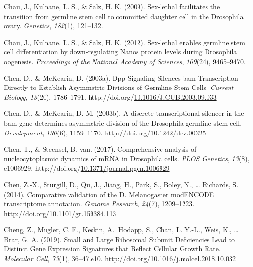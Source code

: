 \documentclass[12pt,oneside]{reedthesis}
\newlength{\cslhangindent}
\newenvironment{CSLReferences}[2] %
 {%
  \setlength{\parindent}{0pt}
  \ifodd #1 \everypar{\setlength{\hangindent}{\cslhangindent}}\ignorespaces\fi
  \ifnum #2 > 0
  \setlength{\parskip}{#2\baselineskip}
  \fi
 }%
 {}
\begin{document}
\begin{CSLReferences}{1}{0}
\leavevmode{}%
Chau, J., Kulnane, L. S., \& Salz, H. K. (2009). Sex-lethal facilitates the transition from germline stem cell to committed daughter cell in the {Drosophila} ovary. \emph{Genetics}, \emph{182}(1), 121--132.

\leavevmode{}%
Chau, J., Kulnane, L. S., \& Salz, H. K. (2012). Sex-lethal enables germline stem cell differentiation by down-regulating {Nanos} protein levels during {Drosophila} oogenesis. \emph{Proceedings of the National Academy of Sciences}, \emph{109}(24), 9465--9470.

\leavevmode{}%
Chen, D., \& McKearin, D. (2003a). Dpp {Signaling Silences} bam {Transcription Directly} to {Establish Asymmetric Divisions} of {Germline Stem Cells}. \emph{Current Biology}, \emph{13}(20), 1786--1791. http://doi.org/\href{https://doi.org/10.1016/J.CUB.2003.09.033}{10.1016/J.CUB.2003.09.033}

\leavevmode{}%
Chen, D., \& McKearin, D. M. (2003b). A discrete transcriptional silencer in the bam gene determines asymmetric division of the {Drosophila} germline stem cell. \emph{Development}, \emph{130}(6), 1159--1170. http://doi.org/\href{https://doi.org/10.1242/dev.00325}{10.1242/dev.00325}

\leavevmode{}%
Chen, T., \& Steensel, B. van. (2017). Comprehensive analysis of nucleocytoplasmic dynamics of {mRNA} in {Drosophila} cells. \emph{PLOS Genetics}, \emph{13}(8), e1006929. http://doi.org/\href{https://doi.org/10.1371/journal.pgen.1006929}{10.1371/journal.pgen.1006929}

\leavevmode{}%
Chen, Z.-X., Sturgill, D., Qu, J., Jiang, H., Park, S., Boley, N., \ldots{} Richards, S. (2014). Comparative validation of the {D}. Melanogaster {modENCODE} transcriptome annotation. \emph{Genome Research}, \emph{24}(7), 1209--1223. http://doi.org/\href{https://doi.org/10.1101/gr.159384.113}{10.1101/gr.159384.113}

\leavevmode{}%
Cheng, Z., Mugler, C. F., Keskin, A., Hodapp, S., Chan, L. Y.-L., Weis, K., \ldots{} Brar, G. A. (2019). Small and {Large Ribosomal Subunit Deficiencies Lead} to {Distinct Gene Expression Signatures} that {Reflect Cellular Growth Rate}. \emph{Molecular Cell}, \emph{73}(1), 36--47.e10. http://doi.org/\href{https://doi.org/10.1016/j.molcel.2018.10.032}{10.1016/j.molcel.2018.10.032}


\end{CSLReferences}
\end{document}

